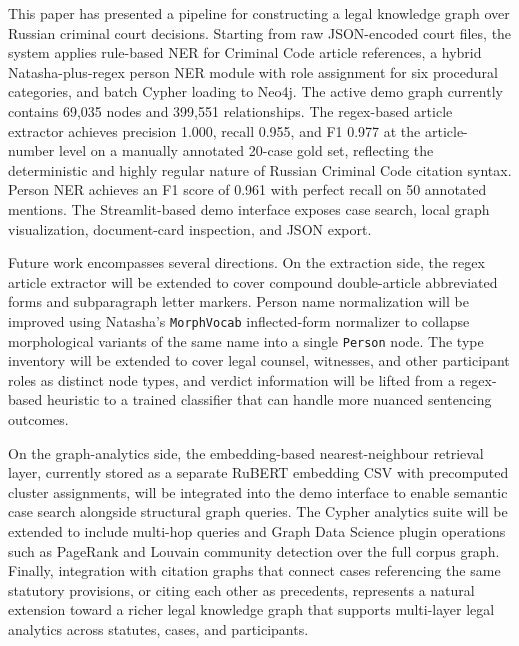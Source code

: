 \documentclass[11pt]{article}
\begin{document}
This paper has presented a pipeline for constructing a legal knowledge graph over Russian criminal court decisions. Starting from raw JSON-encoded court files, the system applies rule-based NER for Criminal Code article references, a hybrid Natasha-plus-regex person NER module with role assignment for six procedural categories, and batch Cypher loading to Neo4j. The active demo graph currently contains 69{,}035 nodes and 399{,}551 relationships. The regex-based article extractor achieves precision 1.000, recall 0.955, and F1 0.977 at the article-number level on a manually annotated 20-case gold set, reflecting the deterministic and highly regular nature of Russian Criminal Code citation syntax. Person NER achieves an F1 score of 0.961 with perfect recall on 50 annotated mentions. The Streamlit-based demo interface exposes case search, local graph visualization, document-card inspection, and JSON export.

Future work encompasses several directions. On the extraction side, the regex article extractor will be extended to cover compound double-article abbreviated forms and subparagraph letter markers. Person name normalization will be improved using Natasha's \texttt{MorphVocab} inflected-form normalizer to collapse morphological variants of the same name into a single \texttt{Person} node. The type inventory will be extended to cover legal counsel, witnesses, and other participant roles as distinct node types, and verdict information will be lifted from a regex-based heuristic to a trained classifier that can handle more nuanced sentencing outcomes.

On the graph-analytics side, the embedding-based nearest-neighbour retrieval layer, currently stored as a separate RuBERT embedding CSV with precomputed cluster assignments, will be integrated into the demo interface to enable semantic case search alongside structural graph queries. The Cypher analytics suite will be extended to include multi-hop queries and Graph Data Science plugin operations such as PageRank and Louvain community detection over the full corpus graph. Finally, integration with citation graphs that connect cases referencing the same statutory provisions, or citing each other as precedents, represents a natural extension toward a richer legal knowledge graph that supports multi-layer legal analytics across statutes, cases, and participants.



\end{document}
